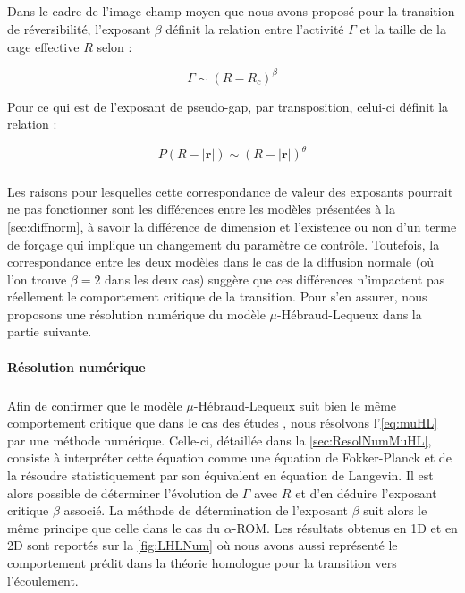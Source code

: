 \subparagraph{}Dans le cadre de l'image champ moyen que nous avons proposé pour la transition de réversibilité, l'exposant $\beta$ définit la relation entre l'activité $\Gamma$ et la taille de la cage effective $R$ selon :

\begin{equation}
	\Gamma \sim (R-R_c)^\beta
\end{equation}

\noindent Pour ce qui est de l'exposant de pseudo-gap, par transposition, celui-ci définit la relation :

\begin{equation}
	P(R-|\mathbf{r}|)\sim (R-|\mathbf{r}|)^\theta
\end{equation}

\subparagraph{}Les raisons pour lesquelles cette correspondance de valeur des exposants pourrait ne pas fonctionner sont les différences entre les modèles présentées à la \autoref{sec:diffnorm}, à savoir la différence de dimension et l'existence ou non d'un terme de forçage qui implique un changement du paramètre de contrôle. Toutefois, la correspondance entre les deux modèles dans le cas de la diffusion normale (où l'on trouve $\beta = 2$ dans les deux cas) suggère que ces différences n'impactent pas réellement le comportement critique de la transition. Pour s'en assurer, nous proposons une résolution numérique du modèle $\mu$-Hébraud-Lequeux dans la partie suivante.

\paragraph{Résolution numérique}

\subparagraph{}Afin de confirmer que le modèle $\mu$-Hébraud-Lequeux suit bien le même comportement critique que dans le cas des études \cite{lin_mean-field_2016, lin_microscopic_2018}, nous résolvons l'\autoref{eq:muHL} par une méthode numérique. Celle-ci, détaillée dans la \autoref{sec:ResolNumMuHL}, consiste à interpréter cette équation comme une équation de Fokker-Planck et de la résoudre statistiquement par son équivalent en équation de Langevin. Il est alors possible de déterminer l'évolution de $\Gamma$ avec $R$ et d'en déduire l'exposant critique $\beta$ associé. La méthode de détermination de l'exposant $\beta$ suit alors le même principe que celle dans le cas du $\alpha$-ROM. Les résultats obtenus en 1D et en 2D sont reportés sur la \autoref{fig:LHLNum} où nous avons aussi représenté le comportement prédit dans la théorie homologue pour la transition vers l'écoulement.

